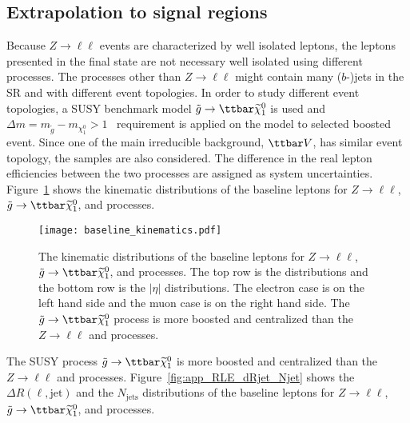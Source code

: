 
\subsection{Extrapolation to signal regions}
\label{subsec:app_RLE_extrapolation_to_signal_region}
Because $Z\to \ell\ell$ events are characterized by well isolated leptons, the leptons presented in the final state are not necessary well isolated using different processes.
The processes other than $Z\to \ell\ell$ might contain many ($b$-)jets in the SR and with different event topologies.
In order to study different event topologies, a SUSY benchmark model $\tilde{g}\to\ttbar \widetilde{\chi}^{0}_{1}$ is used and $\Delta m = m_{\tilde{g}} - m_{\chi^{0}_{1}} > 1$~{\TeV} requirement is applied on the model to selected boosted event.
Since one of the main irreducible background, $\ttbar V$, has similar event topology, the \ttbar samples are also considered.
The difference in the real lepton efficiencies between the two processes are assigned as system uncertainties.
Figure~\ref{fig:app_RLE_kinematic} shows the kinematic distributions of the baseline leptons for $Z\to \ell\ell$, $\tilde{g} \to \ttbar \widetilde{\chi}^{0}_{1}$, and \ttbar processes.

\begin{figure}[htbp]
    \texttt{[image: baseline\_kinematics.pdf]}
    \caption{The kinematic distributions of the baseline leptons for $Z\to \ell\ell$, $\tilde{g} \to \ttbar \widetilde{\chi}^{0}_{1}$, and \ttbar processes.
    The top row is the \pt distributions and the bottom row is the $|\eta|$ distributions.
    The electron case is on the left hand side and the muon case is on the right hand side.
    The $\tilde{g} \to \ttbar \widetilde{\chi}^{0}_{1}$ process is more boosted and centralized than the $Z\to \ell \ell$ and \ttbar processes.}
    \label{fig:app_RLE_kinematic}
\end{figure}

The SUSY process $\tilde{g} \to \ttbar \widetilde{\chi}^{0}_{1}$ is more boosted and centralized than the $Z\to \ell \ell$ and \ttbar processes.
Figure~\ref{fig:app_RLE_dRjet_Njet} shows the $\Delta R(\ell, \mathrm{jet})$ and the $N_\mathrm{jets}$ distributions of the baseline leptons for $Z\to \ell\ell$, $\tilde{g} \to \ttbar \widetilde{\chi}^{0}_{1}$, and \ttbar processes.


